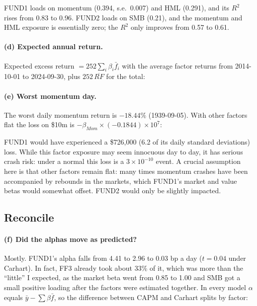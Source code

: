 \documentclass[11pt]{article}
\newcommand{\tbl}[1]{}
\begin{document}
FUND1 loads on momentum (0.394, s.e.\ 0.007) and HML (0.291), and its $R^2$ rises from 0.83 to 0.96. FUND2 loads on SMB (0.21), and the momentum and HML exposure is essentially zero; the $R^2$ only improves from 0.57 to 0.61.

\paragraph{(d) Expected annual return.} Expected excess return $=252\sum_i\beta_i\bar f_i$ with the average factor returns from 2014-10-01 to 2024-09-30, plus $252\,\overline{RF}$ for the total:

\begin{table}[H]
\centering\small
\caption{Expected annual return under the last ten years' factor returns, with and without the four factor alpha, and the realized return in the fund sample.}
\label{tab:p5exp}
\tbl{p5_expected}
\end{table}

\paragraph{(e) Worst momentum day.} The worst daily momentum return is $-18.44\%$ (1939-09-05). With other factors flat the loss on \$10m is $-\beta_{Mom}\times(-0.1844)\times10^7$:

\begin{table}[H]
\centering\small
\caption{One day loss if the worst momentum day repeated.}
\tbl{p5_mom_shock}
\end{table}

FUND1 would have experienced a \$726,000 (6.2 of its daily standard deviations) loss. While this factor exposure may seem innocuous day to day, it has serious crash risk: under a normal this loss is a $3\times10^{-10}$ event. A crucial assumption here is that other factors remain flat: many times momentum crashes have been accompanied by rebounds in the markets, which FUND1's market and value betas would somewhat offset. FUND2 would only be slightly impacted.

\subsection*{Reconcile}

\paragraph{(f) Did the alphas move as predicted?} Mostly. FUND1's alpha falls from 4.41 to 2.96 to 0.03 bp a day ($t=0.04$ under Carhart). In fact, FF3 already took about 33\% of it, which was more than the ``little'' I expected, as the market beta went from 0.85 to 1.00 and SMB got a small positive loading after the factors were estimated together. In every model $\alpha$ equals $\bar y-\sum\beta\bar f$, so the difference between CAPM and Carhart splits by factor:
\end{document}
